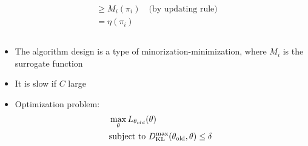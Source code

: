 \documentclass[9pt]{beamer}
\theoremstyle{remark}
\begin{document}
\begin{frame}
\begin{columns}
\begin{column}{0.55\textwidth}
\begin{itemize}
\begin{align*}
                        &\geq M_i(\pi_i) \quad \text{(by updating rule)} \\
                        &= \eta(\pi_i)
                    \end{align*}
            \end{itemize}
        \end{column}
    \end{columns}
    \begin{itemize}
        \item The algorithm design is a type of minorization-minimization, where $M_i$ is the surrogate function
        \item It is slow if $C$ large
        \item Optimization problem:
            \begin{align*}
                &\max_{\theta} L_{\theta_{old}} (\theta)  \\
                &\text{subject to } D_{\rm KL}^{\max} (\theta_{\rm old}, \theta) \leq \delta
            \end{align*} 
    \end{itemize}

\end{frame}
\end{document}
